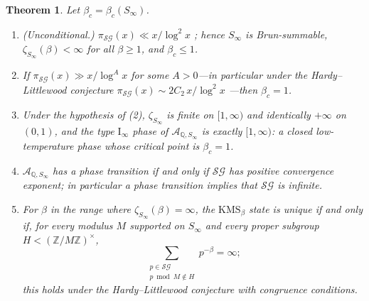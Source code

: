 \documentclass[11pt]{amsart}
\numberwithin{equation}{section}
\newtheorem{theorem}{Theorem}[section]
\theoremstyle{definition}
\theoremstyle{remark}
\newcommand{\Z}{\mathbb{Z}}
\newcommand{\Q}{\mathbb{Q}}
\newcommand{\cA}{\mathcal{A}}
\newcommand{\SG}{\mathcal{SG}}
\begin{document}
\begin{theorem}\label{thm:sg}
Let $\beta_c=\beta_c(S_\infty)$.
\begin{enumerate}
\item \emph{(Unconditional.)} $\pi_\SG(x)\ll x/\log^2x$ \cite{HR}; hence
$S_\infty$ is Brun-summable, $\zeta_{S_\infty}(\beta)<\infty$ for all
$\beta\ge1$, and $\beta_c\le1$.
\item If $\pi_\SG(x)\gg x/\log^Ax$ for some $A>0$---in particular under the
Hardy--Littlewood conjecture $\pi_\SG(x)\sim2C_2\,x/\log^2x$ \cite{HL}---then
$\beta_c=1$.
\item Under the hypothesis of (2), $\zeta_{S_\infty}$ is finite on $[1,\infty)$
and identically $+\infty$ on $(0,1)$, and the type $\mathrm I_\infty$ phase of
$\cA_{\Q,S_\infty}$ is exactly $[1,\infty)$: a closed low-temperature phase
whose critical point is $\beta_c=1$.
\item $\cA_{\Q,S_\infty}$ has a phase transition if and only if $\SG$ has
positive convergence exponent; in particular a phase transition implies that
$\SG$ is infinite.
\item For $\beta$ in the range where $\zeta_{S_\infty}(\beta)=\infty$, the
$\mathrm{KMS}_\beta$ state is unique if and only if, for every modulus $M$
supported on $S_\infty$ and every proper subgroup $H<(\Z/M\Z)^\times$,
\[
\sum_{\substack{p\in\SG\\ p\bmod M\notin H}}p^{-\beta}=\infty ;
\]
this holds under the Hardy--Littlewood conjecture with congruence conditions.
\end{enumerate}
\end{theorem}
\end{document}
